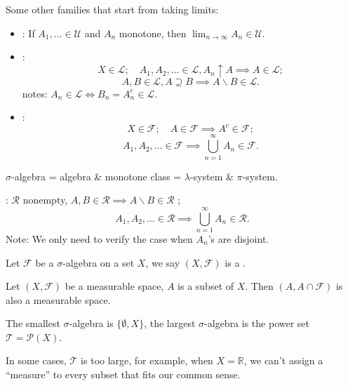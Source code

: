 \begin{definition}
	Some other families that start from taking limits:
	\begin{itemize}
		\item {}: If $A_1,\dots\in \mathscr{U}$ and $A_n$
			monotone, then  $\lim_{n\to \infty}A_n \in\mathscr{U}$.
		\item {}: 
			\[
			X\in \mathscr{L};\quad
			A_1,A_2,\dots\in \mathscr{L}, A_n \uparrow A\implies A\in \mathscr{L};
			\]
			\[
			A,B\in \mathscr{L}, A \supseteq B \implies A\backslash B \in\mathscr{L}.
			\]
			notes: $A_n\in \mathscr{L}\iff B_n = A_n^c\in \mathscr{L}$.

		\item {}: 
			\[
			X\in \mathscr{F};\quad A\in \mathscr{F}\implies A^c\in \mathscr{F};
			\]
			\[
			A_1,A_2,\dots\in \mathscr{F}\implies
			\bigcup_{n=1}^\infty A_n\in \mathscr{F}.
			\]
	\end{itemize}
\end{definition}
\begin{proposition}
	$\sigma$-algebra = algebra \& monotone class =
	$\lambda$-system \&  $\pi$-system.
\end{proposition}
\begin{definition}
	:  $\mathscr{R}$ nonempty, $A,B\in \mathscr{R}\implies
	A\backslash B\in \mathscr{R}$ ;
	\[
	A_1,A_2,\dots\in \mathscr{R}\implies \bigcup_{n=1}^\infty A_n\in \mathscr{R}.
	\]
	Note: We only need to verify the case when $A_n$'s are disjoint.
\end{definition}

\begin{definition}
	Let $\mathscr{F}$ be a $\sigma$-algebra on a set $X$,
	we say $(X, \mathscr{F})$ is a .
\end{definition}

\begin{proposition}
	Let $(X,\mathscr{F})$ be a measurable space, $A$ is a subset of $X$.
	Then $(A, A\cap \mathscr{F})$ is also a measurable space.
\end{proposition}

The smallest $\sigma$-algebra is  $\{\emptyset, X\}$,
the largest $\sigma$-algebra is the power set $\mathscr{T}=\mathcal{P}(X)$.

In some cases, $\mathscr{T}$ is too large, for example,
when $X=\mathbb{R}$, we can't assign a ``measure'' to every subset
that fits our common sense.
